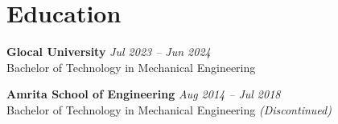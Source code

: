 \documentclass[a4paper,10pt]{article}
\begin{document}
\section{Education}

\textbf{Glocal University}
\hfill \textit{Jul 2023 -- Jun 2024}\\
Bachelor of Technology in Mechanical Engineering

\vspace{4pt}

\textbf{Amrita School of Engineering}
\hfill \textit{Aug 2014 -- Jul 2018}\\
Bachelor of Technology in Mechanical Engineering
\textit{(Discontinued)}
\end{document}
